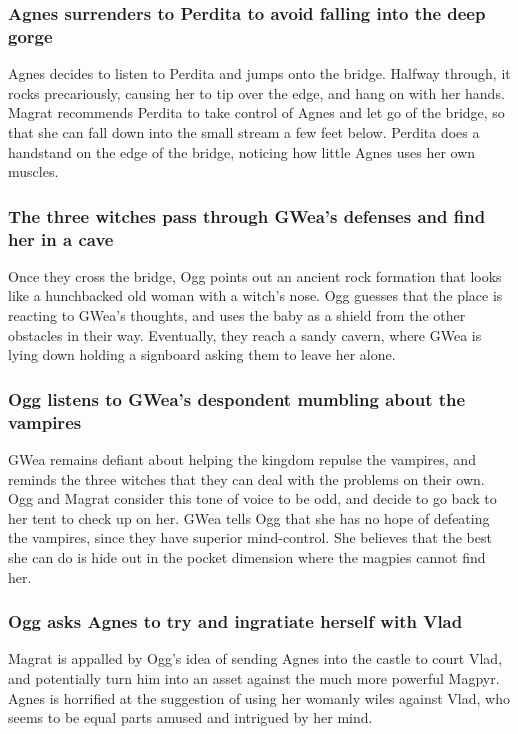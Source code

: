 \subsubsection{\Gls{Agnes} surrenders to \Gls{Perdita} to avoid falling into the deep gorge}
\Gls{Agnes} decides to listen to \Gls{Perdita} and jumps onto the bridge. Halfway through, it rocks
precariously, causing her to tip over the edge, and hang on with her hands. \Gls{Magrat} recommends
\Gls{Perdita} to take control of \Gls{Agnes} and let go of the bridge, so that she can fall down
into the small stream a few feet below. \Gls{Perdita} does a handstand on the edge of the bridge,
noticing how little \Gls{Agnes} uses her own muscles.

\subsubsection{The three witches pass through \Gls{GWea}'s defenses and find her in a cave}
Once they cross the bridge, \Gls{Ogg} points out an ancient rock formation that looks like a
hunchbacked old woman with a witch's nose. \Gls{Ogg} guesses that the place is reacting to
\Gls{GWea}'s thoughts, and uses the baby as a shield from the other obstacles in their way.
Eventually, they reach a sandy cavern, where \Gls{GWea} is lying down holding a signboard asking
them to leave her alone.

\subsubsection{\Gls{Ogg} listens to \Gls{GWea}'s despondent mumbling about the vampires}
\Gls{GWea} remains defiant about helping the kingdom repulse the vampires, and reminds the three
witches that they can deal with the problems on their own. \Gls{Ogg} and \Gls{Magrat} consider this
tone of voice to be odd, and decide to go back to her tent to check up on her. \Gls{GWea} tells
\Gls{Ogg} that she has no hope of defeating the vampires, since they have superior mind-control. She
believes that the best she can do is hide out in the pocket dimension where the magpies cannot find
her.

\subsubsection{\Gls{Ogg} asks \Gls{Agnes} to try and ingratiate herself with \Gls{Vlad}}
\Gls{Magrat} is appalled by \Gls{Ogg}'s idea of sending \Gls{Agnes} into the castle to court
\Gls{Vlad}, and potentially turn him into an asset against the much more powerful \Gls{Magpyr}.
\Gls{Agnes} is horrified at the suggestion of using her womanly wiles against \Gls{Vlad}, who seems
to be equal parts amused and intrigued by her mind.

